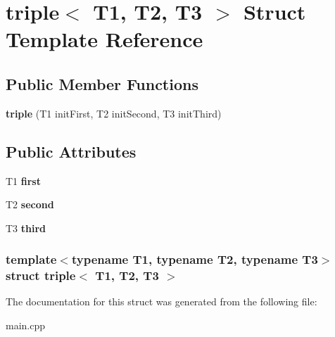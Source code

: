 \hypertarget{structtriple}{
\section{triple$<$ T1, T2, T3 $>$ Struct Template Reference}
\label{structtriple}
}
\subsection*{Public Member Functions}
\begin{DoxyCompactItemize}
\item 
\hypertarget{structtriple_a27bdf823f9e58bdc76e489ec33f4b375}{
{\bfseries triple} (T1 initFirst, T2 initSecond, T3 initThird)}
\label{structtriple_a27bdf823f9e58bdc76e489ec33f4b375}

\end{DoxyCompactItemize}
\subsection*{Public Attributes}
\begin{DoxyCompactItemize}
\item 
\hypertarget{structtriple_a6aa8508e6e6f859dda04f144f361c0d2}{
T1 {\bfseries first}}
\label{structtriple_a6aa8508e6e6f859dda04f144f361c0d2}

\item 
\hypertarget{structtriple_a41050194c8c7984707c7ad13c96e8631}{
T2 {\bfseries second}}
\label{structtriple_a41050194c8c7984707c7ad13c96e8631}

\item 
\hypertarget{structtriple_a5675f08ea7996033edbcf7074404cdd8}{
T3 {\bfseries third}}
\label{structtriple_a5675f08ea7996033edbcf7074404cdd8}

\end{DoxyCompactItemize}
\subsubsection*{template$<$typename T1, typename T2, typename T3$>$ struct triple$<$ T1, T2, T3 $>$}



The documentation for this struct was generated from the following file:\begin{DoxyCompactItemize}
\item 
main.cpp\end{DoxyCompactItemize}
